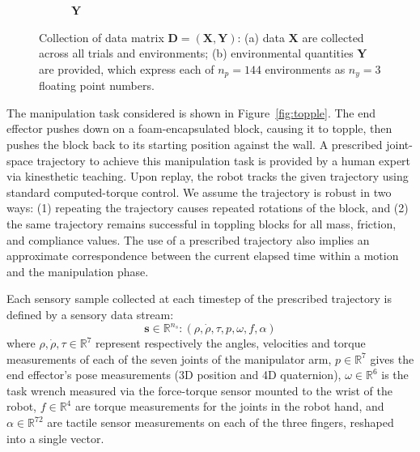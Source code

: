 \begin{figure}[h]
\begin{subfigure}[t]{0.43\linewidth}
    \caption{$\mathbf{Y}$}%
    \label{fig:Y_defn}
  \end{subfigure}
  \caption{Collection of data matrix $\mathbf{D} = (\mathbf{X},\mathbf{Y})$: (a) data $\mathbf{X}$ are collected across all trials and environments; (b) environmental quantities $\mathbf{Y}$ are provided, which express each of $n_p = 144$ environments as $n_y=3$ floating point numbers.}
\end{figure}

The manipulation task considered is shown in Figure~\ref{fig:topple}. 
The end effector pushes down on a foam-encapsulated block, causing it to topple, then pushes the block back to its starting position against the wall.
A prescribed joint-space trajectory to achieve this manipulation task is provided by a human expert via kinesthetic teaching.
Upon replay, the robot tracks the given trajectory using standard computed-torque control.
We assume the trajectory is robust in two ways: (1) repeating the trajectory causes repeated rotations of the block, and (2) the same trajectory remains successful in toppling blocks for all mass, friction, and compliance values.
The use of a prescribed trajectory also implies an approximate correspondence between the current elapsed time within a motion and the manipulation phase.  

Each sensory sample collected at each timestep of the prescribed trajectory is defined by a sensory data stream:
\begin{equation}
\mathbf{s}\in\mathbb{R}^{n_s}:
(\rho,\dot{\rho},\tau,p,\omega,f,\alpha)
\end{equation}
  where $\rho,\dot{\rho},\tau\in\mathbb{R}^{7}$ represent respectively the angles, velocities and torque measurements of each of the seven joints of the manipulator arm, $p\in\mathbb{R}^{7}$ gives the end effector's pose measurements (3D position and 4D quaternion), $\omega \in\mathbb{R}^{6}$ is the task wrench measured via the force-torque sensor mounted to the wrist of the robot, $f \in\mathbb{R}^{4}$ are torque measurements for the joints in the robot hand, and $\alpha \in\mathbb{R}^{72}$ are tactile sensor measurements on each of the three fingers, reshaped into a single vector.


